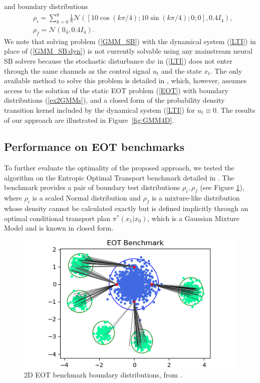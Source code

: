 \documentclass[twoside]{article}
\renewcommand{\eqref}[1]{(\ref{#1})}
\newcommand{\N}{\mathcal{N}}
\renewcommand{\d}{\mathrm{d}}
\begin{document}
and boundary distributions 
\begin{subequations}\label{ex2GMMs}
\begin{align} 
    & \rho_i = \sum_{k=0}^8 \frac{1}{8} \N( \left[ 10 \cos(k \pi/4); 10 \sin(k \pi/4); 0; 0\right], 0.4 I_4), \\
    & \rho_f = \N(0_4, 0.4 I_4).
\end{align}
\end{subequations}
%
We note that solving problem \eqref{GMM_SB} with the dynamical system \eqref{LTI} in place of \eqref{GMM_SB:dyn} is not currently solvable using any mainstream neural SB solvers because the stochastic disturbance $\d w$ in \eqref{LTI} does not enter through the same channels as the control signal $u_t$ and the state $x_t$.
The only available method to solve this problem is detailed in \citep{chen2016optimal}, which, however, assumes access to the solution of the static EOT problem \eqref{EOT} with
boundary distributions \eqref{ex2GMMs}, and a closed form of the probability density transition kernel included by the dynamical system \eqref{LTI} for $u_t \equiv 0$.
The results of our approach are illustrated in Figure~\ref{fig:GMM4D}.
%
%
\subsection{Performance on EOT benchmarks}
%
%
%
To further evaluate the optimality of the proposed approach, we tested the algorithm on the Entropic Optimal Transport benchmark detailed in \citep{gushchin2023building}.
The benchmark provides a pair of boundary test distributions $\rho_i, \rho_f$ (see Figure \ref{fig:building}), where $\rho_i$ is a scaled Normal distribution and $\rho_f$ is a mixture-like distribution whose density cannot be calculated exactly but is defined implicitly through an optimal conditional transport plan $\pi^*(x_1 \vert x_0)$, which is a Gaussian Mixture Model and is known in closed form.

\begin{figure}[htb]
    \centering
    \includegraphics[width=0.9\linewidth]{figures/gwtf_benchmark.png}
    \caption{2D EOT benchmark boundary distributions, from \citep{gushchin2023building}.}
    \label{fig:building}
\end{figure}
\end{document}
